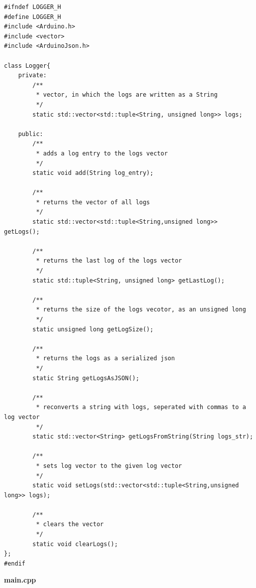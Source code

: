 \documentclass[11pt, twoside]{article}
\begin{document}
\begin{lstlisting}
#ifndef LOGGER_H
#define LOGGER_H
#include <Arduino.h>
#include <vector>
#include <ArduinoJson.h>

class Logger{
    private:
        /**
         * vector, in which the logs are written as a String
         */
        static std::vector<std::tuple<String, unsigned long>> logs;

    public:
        /**
         * adds a log entry to the logs vector
         */
        static void add(String log_entry);

        /**
         * returns the vector of all logs
         */
        static std::vector<std::tuple<String,unsigned long>> getLogs();

        /**
         * returns the last log of the logs vector
         */
        static std::tuple<String, unsigned long> getLastLog();

        /**
         * returns the size of the logs vecotor, as an unsigned long
         */
        static unsigned long getLogSize();

        /**
         * returns the logs as a serialized json
         */
        static String getLogsAsJSON();

        /**
         * reconverts a string with logs, seperated with commas to a log vector
         */
        static std::vector<String> getLogsFromString(String logs_str);

        /**
         * sets log vector to the given log vector
         */
        static void setLogs(std::vector<std::tuple<String,unsigned long>> logs);

        /**
         * clears the vector
         */
        static void clearLogs();
};
#endif\end{lstlisting}

\textbf{main.cpp}
\end{document}
